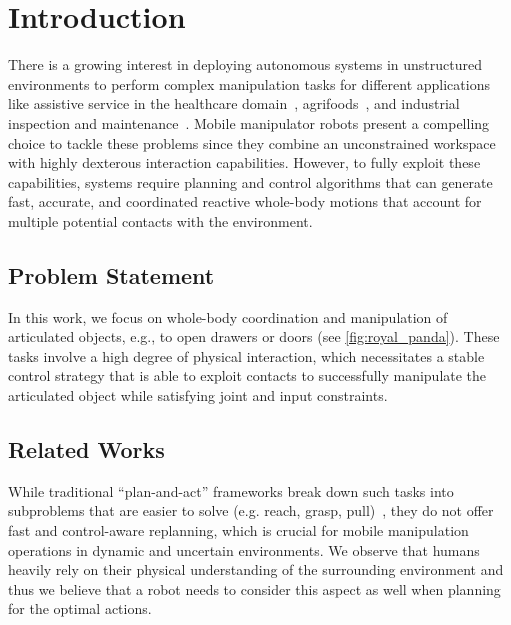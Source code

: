\section{Introduction} \label{sec:introduction}

There is a growing interest in deploying autonomous systems in unstructured environments to perform complex manipulation tasks for different applications like assistive service in the healthcare domain~\cite{cooper2020ari}, agrifoods~\cite{duckett2018agricultural}, and industrial inspection and maintenance~\cite{lattanzi2017review}. Mobile manipulator robots present a compelling choice to tackle these problems since they combine an unconstrained workspace with highly dexterous interaction capabilities. However, to fully exploit these capabilities, systems require planning and control algorithms that can generate fast, accurate, and coordinated reactive whole-body motions that account for multiple potential contacts with the environment. 

\subsection{Problem Statement}


In this work, we focus on whole-body coordination and manipulation of articulated objects, e.g., to open drawers or doors (see \fig\ref{fig:royal_panda}). 
These tasks involve a high degree of physical interaction, which necessitates a stable control strategy that is able to exploit contacts to successfully manipulate the articulated object while satisfying joint and input constraints.

\subsection{Related Works}

While traditional ``plan-and-act'' frameworks break down such tasks into subproblems that are easier to solve (e.g. reach, grasp, pull)~\cite{Murali2020}, they do not offer fast and control-aware replanning, which is crucial for mobile manipulation operations in dynamic and uncertain environments. We observe that humans heavily rely on their physical understanding of the surrounding environment and thus we believe that a robot needs to consider this aspect as well when planning for the optimal actions.

